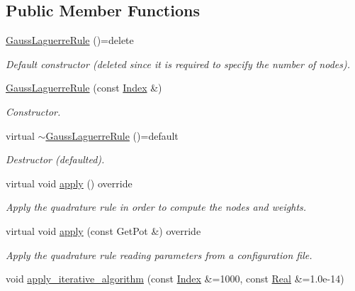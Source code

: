 \subsection*{Public Member Functions}
\begin{DoxyCompactItemize}
\item 
\hypertarget{classGaussLaguerreRule_a901d09ecb8e1c7af40a264a43395d557}{\hyperlink{classGaussLaguerreRule_a901d09ecb8e1c7af40a264a43395d557}{Gauss\-Laguerre\-Rule} ()=delete}\label{classGaussLaguerreRule_a901d09ecb8e1c7af40a264a43395d557}

\begin{DoxyCompactList}\small\item\em Default constructor (deleted since it is required to specify the number of nodes). \end{DoxyCompactList}\item 
\hyperlink{classGaussLaguerreRule_a426a1a58536ef20d3e934fbbf54b6b49}{Gauss\-Laguerre\-Rule} (const \hyperlink{typedefs_8h_a2c726f8f32697958e9d6c2afecda531d}{Index} \&)
\begin{DoxyCompactList}\small\item\em Constructor. \end{DoxyCompactList}\item 
\hypertarget{classGaussLaguerreRule_a720d3022a82e98afb4045d0efc0694d5}{virtual \hyperlink{classGaussLaguerreRule_a720d3022a82e98afb4045d0efc0694d5}{$\sim$\-Gauss\-Laguerre\-Rule} ()=default}\label{classGaussLaguerreRule_a720d3022a82e98afb4045d0efc0694d5}

\begin{DoxyCompactList}\small\item\em Destructor (defaulted). \end{DoxyCompactList}\item 
\hypertarget{classGaussLaguerreRule_ae5502fed0f3128dce83d1280a834ffac}{virtual void \hyperlink{classGaussLaguerreRule_ae5502fed0f3128dce83d1280a834ffac}{apply} () override}\label{classGaussLaguerreRule_ae5502fed0f3128dce83d1280a834ffac}

\begin{DoxyCompactList}\small\item\em Apply the quadrature rule in order to compute the nodes and weights. \end{DoxyCompactList}\item 
virtual void \hyperlink{classGaussLaguerreRule_a6265ae995213bef29d216da947f5f692}{apply} (const Get\-Pot \&) override
\begin{DoxyCompactList}\small\item\em Apply the quadrature rule reading parameters from a configuration file. \end{DoxyCompactList}\item 
\hypertarget{classGaussLaguerreRule_a5a21a96592fcd473df6739c72c083063}{void \hyperlink{classGaussLaguerreRule_a5a21a96592fcd473df6739c72c083063}{apply\-\_\-iterative\-\_\-algorithm} (const \hyperlink{typedefs_8h_a2c726f8f32697958e9d6c2afecda531d}{Index} \&=1000, const \hyperlink{typedefs_8h_a060b837c3b4486ee35317744156f3da2}{Real} \&=1.\-0e-\/14)}\label{classGaussLaguerreRule_a5a21a96592fcd473df6739c72c083063}


\end{DoxyCompactItemize}
